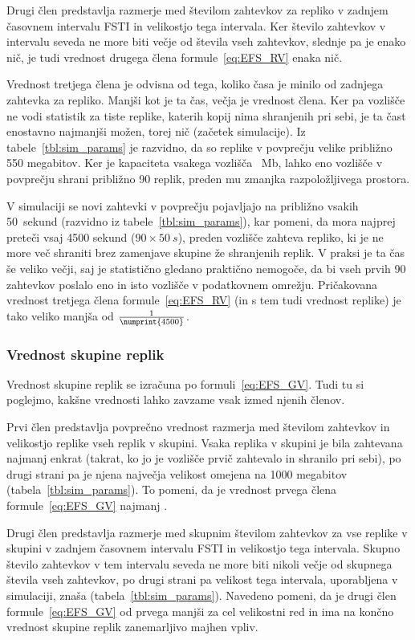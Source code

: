\documentclass[a4paper, 12pt]{book}
\begin{document}
Drugi člen predstavlja razmerje med številom zahtevkov za repliko v zadnjem
časovnem intervalu FSTI in velikostjo tega intervala. Ker število zahtevkov
v intervalu seveda ne more biti večje od števila vseh zahtevkov,
slednje pa je enako nič, je tudi vrednost drugega člena
formule~\eqref{eq:EFS_RV} enaka nič.

Vrednost tretjega člena je odvisna od tega, koliko časa je minilo
od zadnjega zahtevka za repliko. Manjši kot je ta čas, večja je vrednost člena.
Ker pa vozlišče ne vodi statistik za tiste replike, katerih kopij nima
shranjenih pri sebi, je ta čast enostavno najmanjši možen, torej nič (začetek
simulacije). Iz tabele~\ref{tbl:sim_params} je razvidno, da so replike v
povprečju velike približno 550 megabitov. Ker je kapaciteta vsakega vozlišča
~Mb, lahko eno vozlišče v povprečju shrani približno 90
replik, preden mu zmanjka razpoložljivega prostora.

V simulaciji se novi zahtevki v povprečju pojavljajo na približno vsakih
50~sekund (razvidno iz tabele~\ref{tbl:sim_params}), kar pomeni, da mora
najprej preteči vsaj 4500 sekund ($90 \times 50\:s$), preden vozlišče
zahteva repliko, ki je ne more več shraniti brez zamenjave skupine
že shranjenih replik. V praksi je ta čas še veliko večji, saj je statistično
gledano praktično nemogoče, da bi vseh prvih 90 zahtevkov poslalo eno in isto
vozlišče v podatkovnem omrežju. Pričakovana vrednost tretjega člena
formule~\eqref{eq:EFS_RV} (in s tem tudi vrednost replike) je tako veliko
manjša od $\frac{1}{\numprint{4500}}$.

\subsubsection{Vrednost skupine replik}

Vrednost skupine replik se izračuna po formuli~\eqref{eq:EFS_GV}. Tudi tu si
poglejmo, kakšne vrednosti lahko zavzame vsak izmed njenih členov.

Prvi člen predstavlja povprečno vrednost razmerja med številom zahtevkov in
velikostjo replike vseh replik v skupini. Vsaka replika v skupini je bila
zahtevana najmanj enkrat (takrat, ko jo je vozlišče prvič zahtevalo in shranilo
pri sebi), po drugi strani pa je njena največja velikost omejena na
1000 megabitov (tabela~\ref{tbl:sim_params}). To pomeni, da je vrednost
prvega člena formule~\eqref{eq:EFS_GV} najmanj .

Drugi člen predstavlja razmerje med skupnim številom zahtevkov za vse replike
v skupini v zadnjem časovnem intervalu FSTI in velikostjo tega intervala.
Skupno število zahtevkov v tem intervalu seveda ne more biti nikoli večje od
skupnega števila vseh zahtevkov, po drugi strani pa velikost tega intervala,
uporabljena v simulaciji, znaša  (tabela~\ref{tbl:sim_params}).
Navedeno pomeni, da je drugi člen formule~\eqref{eq:EFS_GV} od prvega manjši za
cel velikostni red in ima na končno vrednost skupine replik zanemarljivo
majhen vpliv.
\end{document}
